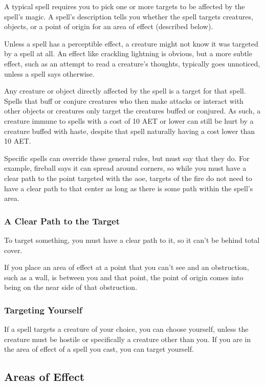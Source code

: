 A typical spell requires you to pick one or more targets to be affected by the spell's magic. A spell's description tells you whether the spell targets creatures, objects, or a point of origin for an area of effect (described below).

Unless a spell has a perceptible effect, a creature might not know it was targeted by a spell at all. An effect like crackling lightning is obvious, but a more subtle effect, such as an attempt to read a creature's thoughts, typically goes unnoticed, unless a spell says otherwise.

Any creature or object directly affected by the spell is a target for that spell. Spells that buff or conjure creatures who then make attacks or interact with other objects or creatures only target the creatures buffed or conjured. As such, a creature immune to spells with a cost of 10 AET or lower can still be hurt by a creature buffed with haste, despite that spell naturally having a cost lower than 10 AET.

Specific spells can override these general rules, but must say that they do. For example, fireball says it can spread around corners, so while you must have a clear path to the point targeted with the aoe, targets of the fire do not need to have a clear path to that center as long as there is some path within the spell's area.

\subsubsection{A Clear Path to the Target}

To target something, you must have a clear path to it, so it can't be behind total cover.

If you place an area of effect at a point that you can't see and an obstruction, such as a wall, is between you and that point, the point of origin comes into being on the near side of that obstruction.

\subsubsection{Targeting Yourself}

If a spell targets a creature of your choice, you can choose yourself, unless the creature must be hostile or specifically a creature other than you. If you are in the area of effect of a spell you cast, you can target yourself.

\subsection{Areas of Effect}\label{subsec:areas-of-effect}

